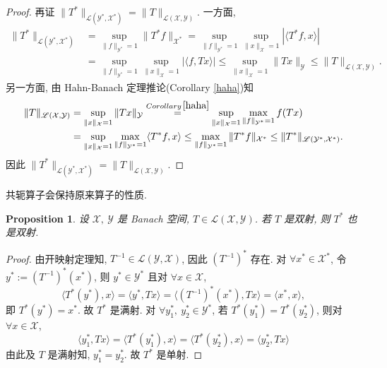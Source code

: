 \documentclass[a4paper,11pt]{article}
\newtheorem{proposition}[theorem]{Proposition}
\theoremstyle{definition}
\begin{document}
\begin{CJK*}{UTF8}{gbsn}
\begin{proof}
    再证 $ \| T^* \|_{\mathscr{L}(\mathcal{Y}^*, \mathcal{X}^*)} = \| T \|_{\mathscr{L}(\mathcal{X}, \mathcal{Y})} $.
    一方面, 
    \begin{align*}
        \| T^* \|_{\mathscr{L}(\mathcal{Y}^*, \mathcal{X}^*)}
            &= \sup_{\| f \|_{\mathcal{Y}^*} = 1}  \| T^* f \|_{\mathcal{X}^*}
            = \sup_{\| f \|_{\mathcal{Y}^*} = 1} \sup_{\| x \|_\mathcal{X} = 1} |\langle T^* f, x \rangle| \\
            &= \sup_{\| f \|_{\mathcal{Y}^*} = 1} \sup_{\| x \|_\mathcal{X} = 1} |\langle f, Tx \rangle|
            \leq \sup_{\| x \|_\mathcal{X} = 1} \| Tx \|_\mathcal{Y}
            \leq \| T \|_{\mathscr{L}(\mathcal{X}, \mathcal{Y})}.
    \end{align*}
    另一方面, 由 Hahn-Banach 定理推论(Corollary \ref{haha})知
    \begin{align*}
        \| T \|_{\mathscr{L}(\mathcal{X}, \mathcal{Y})}
            &= \sup_{\| x \|_\mathcal{X} = 1}  \| T x \|_\mathcal{Y}
            \overset{Corollary \, \ref{haha}}{=} 
                \sup_{\| x \|_\mathcal{X} = 1} \max_{\| f \|_{\mathcal{Y}^*} = 1}  f(T x) \\
            &= \sup_{\| x \|_\mathcal{X} = 1} \max_{\| f \|_{\mathcal{Y}^*} = 1} \langle T^* f, x \rangle
            \leq \max_{\| f \|_{\mathcal{Y}^*} = 1} \| T^* f \|_{\mathcal{X}^*}
            \leq \| T^* \|_{\mathscr{L}(\mathcal{Y}^*, \mathcal{X}^*)}.
    \end{align*}
    因此 $ \| T^* \|_{\mathscr{L}(\mathcal{Y}^*, \mathcal{X}^*)} = \| T \|_{\mathscr{L}(\mathcal{X}, \mathcal{Y})} $.
\end{proof}

共轭算子会保持原来算子的性质.

\begin{proposition} \label{1}
    设 $ \mathcal{X},\ \mathcal{Y} $ 是 Banach 空间, $ T \in \mathscr{L}(\mathcal{X}, \mathcal{Y}) $. 
    若 $ T $ 是双射, 则 $ T^* $ 也是双射.
\end{proposition}

\begin{proof} 
    由开映射定理知, $ T^{-1} \in \mathscr{L}(\mathcal{Y}, \mathcal{X}) $, 因此 $ (T^{-1})^* $ 存在.
    对 $ \forall x^* \in \mathcal{X}^* $, 令 $ y^* := (T^{-1})^* (x^*) $,
    则 $ y^* \in \mathcal{Y}^* $ 且对 $ \forall x \in \mathcal{X} $,
    $$
        \langle T^* (y^*), x \rangle 
            = \langle y^*, T x \rangle
            = \langle (T^{-1})^* (x^*), T x \rangle 
            = \langle x^*, x \rangle,
    $$
    即 $ T^* (y^*) = x^* $. 故 $ T^* $ 是满射.
    对 $ \forall y_1^*,\ y_2^* \in \mathcal{Y}^* $, 若 $ T^* (y_1^*) = T^* (y_2^*) $, 
    则对 $ \forall x \in \mathcal{X} $,
    $$
        \langle y_1^*, T x \rangle 
            = \langle T^* (y_1^*), x \rangle 
            = \langle T^* (y_2^*), x \rangle 
            = \langle y_2^*, T x \rangle 
    $$
    由此及 $ T $ 是满射知, $ y_1^* = y_2^* $. 故 $ T^* $ 是单射.
\end{proof}


\end{CJK*}
\end{document}

